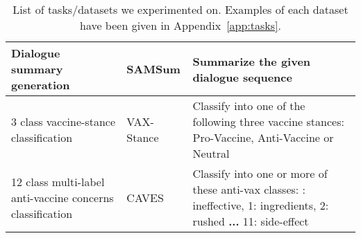 \begin{table*}[ht]
\begin{tabular}{p{45mm}|p{28mm}|p{70mm}}
    Dialogue summary generation & SAMSum \cite{gliwa2019samsum} & Summarize the given dialogue sequence \\
    \hline
    3 class vaccine-stance classification & VAX-Stance \cite{poddar2022winds} & Classify into one of the following three vaccine stances: Pro-Vaccine, Anti-Vaccine or Neutral \\
    12 class multi-label anti-vaccine concerns classification & CAVES \cite{poddar2022caves} & Classify into one or more of these anti-vax classes: \qquad 0: ineffective, 1: ingredients, 2: rushed \textbf{...} 11: side-effect \\
    \bottomrule
    \end{tabular}
    \vspace*{-2mm}
    \caption{List of tasks/datasets we experimented on. Examples of each dataset have been given in Appendix~\ref{app:tasks}.}
    \label{tab:tasks}
    \vspace*{-4mm}
\end{table*}
\fi